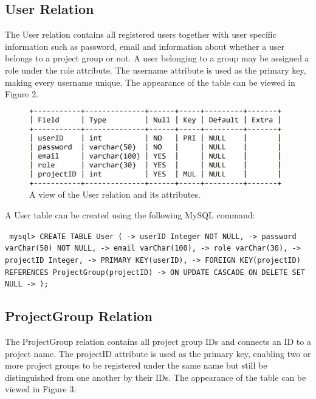 \documentclass{article}
\begin{document}
\subsection{User Relation}
The User relation contains all registered users together with user specific information such as password, email and information about whether a user belongs to a project group or not. A user belonging to a group may be assigned a role under the role attribute. The username attribute is used as the primary key, making every username unique. The appearance of the table can be viewed in Figure 2.

\begin{figure}[H]
     \centering
     \includegraphics[width=11cm]{images/SQL_tables/user.png}
     \renewcommand\figurename{Figure}
     \caption{A view of the User relation and its attributes.}
     \label{fig:my_label}
 \end{figure}

A User table can be created using the following MySQL command:
\newline

\small
\texttt{
\noindent mysql> CREATE TABLE User (\newline
\indent\indent\indent -> userID Integer NOT NULL,\newline
\indent\indent\indent -> password varChar(50) NOT NULL,\newline
\indent\indent\indent -> email varChar(100),\newline
\indent\indent\indent -> role varChar(30),\newline
\indent\indent\indent -> projectID Integer,\newline
\indent\indent\indent -> PRIMARY KEY(userID),\newline
\indent\indent\indent -> FOREIGN KEY(projectID) REFERENCES ProjectGroup(projectID)\newline
\indent\indent\indent -> ON UPDATE CASCADE ON DELETE SET NULL\newline
\indent\indent\indent -> );\newline
}
\normalsize

\subsection{ProjectGroup Relation}
The ProjectGroup relation contains all project group IDs and connects an ID to a project name. The projectID attribute is used as the primary key, enabling two or more project groups to be registered under the same name but still be distinguished from one another by their IDs.  The appearance of the table can be viewed in Figure 3.
\end{document}
